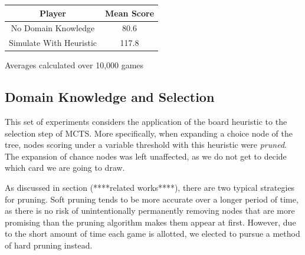 \documentclass[letterpaper]{article}
\begin{document}

\begin{minipage}{\linewidth}
\centering
\label{tbl:SimulateTable}
\begin{tabular}{c c}
\hline
Player & Mean Score \\
\hline
No Domain Knowledge & 80.6 \\
Simulate With Heuristic & 117.8 \\
\hline
\end{tabular}\par
\bigskip
Averages calculated over 10,000 games
\end{minipage}

\subsection{Domain Knowledge and Selection}

%
%
This set of experiments considers the application of the board heuristic to the selection step of MCTS. More specifically, when expanding a choice node of the tree, nodes scoring under a variable threshold with this heuristic were {\it pruned}. The expansion of chance nodes was left unaffected, as we do not get to decide which card we are going to draw. 

As discussed in section (****related works****), there are two typical strategies for pruning. Soft pruning tends to be more accurate over a longer period of time, as there is no risk of unintentionally permanently removing nodes that are more promising than the pruning algorithm makes them appear at first. However, due to the short amount of time each game is allotted, we elected to pursue a method of hard pruning instead.
\end{document}
